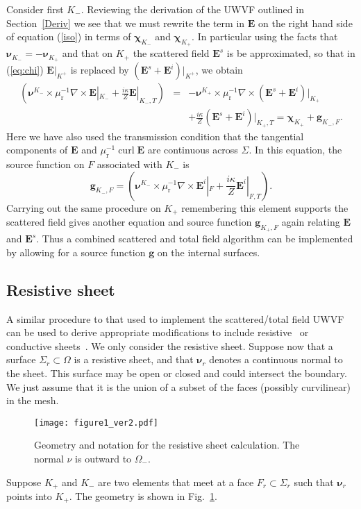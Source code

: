 \documentclass[a4paper,12pt]{article}
\newcommand{\bfE}{\mathbf{E}}
\newcommand{\bfnu}{\boldsymbol{\nu}}
\newcommand{\bfchi}{\boldsymbol{\chi}}
\newcommand{\bfg}{\mathbf{g}}
\DeclareMathOperator{\curl}{curl}
\newcommand{\mur}{\mu_{\mathrm{r}}}
\begin{document}
  Consider first $K_-$. Reviewing the derivation of the UWVF outlined in Section~\ref{Deriv} we see that we must rewrite the term in $\bfE$ on the right hand side
  of equation (\ref{iso}) in terms of $\bfchi_{K_-}$ and $\bfchi_{K_+}$. In particular using the facts that $\bfnu_{K_-}=-\bfnu_{K_+}$ and that on $K_+$ the scattered field $\bfE^s$ is  be approximated, so that in (\ref{eq:chi}) $\bfE|_{K^+}$ is replaced by $(\bfE^s+\bfE^i)|_{K^+}$, we obtain 
  \begin{eqnarray*}
 \left(
\bfnu^{K_-}\times\mur^{-1}\nabla\times\bfE|_{K_-}+\frac{i\kappa{}}{Z} \bfE|_{K_-,T}\right) &=&-\bfnu^{K_+}\times\mur^{-1}\nabla\times(\bfE^s+\bfE^i)|_{K_+}\\&& +\frac{i\kappa{}}{Z} (\bfE^s+\bfE^i)|_{K_+,T}=\bfchi_{K_+}+\bfg_{K_-,F}.
\end{eqnarray*}
Here we have also used the transmission condition that the tangential components of $\bfE$ and $\mur^{-1}\curl\bfE$ are continuous across $\Sigma$.  In this equation, the source function on $F$ associated with $K_-$ is
\[
\bfg_{K_-,F}=\left(\bfnu^{K_-}\times\mur^{-1}\nabla\times \bfE^i|_{F}+\frac{i\kappa{}}{Z} \bfE^i|_{F,T}\right).
\]
Carrying out the same procedure on $K_+$ remembering this element supports the scattered field gives another equation and source function
$\bfg_{K_+,F}$ again relating $\bfE$ and $\bfE^s$.  Thus a combined scattered and total field algorithm can be 
implemented by allowing for a source function $\bfg$ on the  internal
surfaces.

\subsection{Resistive sheet}
A similar procedure to that used to implement the scattered/total field UWVF can be used to derive appropriate modifications
to include resistive~\cite{jin_volakis} or conductive sheets~\cite{Senior}.  We only consider the resistive sheet.  Suppose now that a surface $\Sigma_r\subset\Omega$ is a resistive sheet, and that $\bfnu_r$ denotes a continuous normal to the sheet. This surface may be open or closed and could intersect the boundary.  We just assume that it is the union of a subset of the faces (possibly curvilinear) in the mesh. 
\begin{figure}
\begin{center}
    \texttt{[image: figure1\_ver2.pdf]} 
\caption{Geometry and notation for the resistive sheet calculation.  The normal $\nu$ is outward to $\Omega_-$.}
\label{fig:Et}
\end{center}
\end{figure}
Suppose $K_+$ and $K_-$ are two elements that meet at a face $F_r\subset \Sigma_r$ such that $\bfnu_r$ points into $K_+$.
The geometry is shown in Fig.~\ref{fig:Et}.
\end{document}
